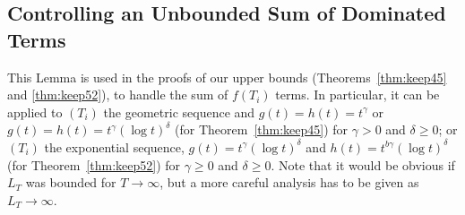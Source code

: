 \documentclass[12pt]{colt2018} %
\begin{document}
\subsection{Controlling an Unbounded Sum of Dominated Terms}

This Lemma is used in the proofs of our upper bounds (Theorems~\ref{thm:keep45} and \ref{thm:keep52}),
to handle the sum of $f(T_i)$ terms.
%
In particular, it can be applied to $(T_i)$ the geometric sequence and $g(t) = h(t) = t^{\gamma}$ or $g(t) = h(t) = t^{\gamma} (\log t)^{\delta}$ (for Theorem~\ref{thm:keep45})
for $\gamma>0$ and $\delta\geq0$;
or $(T_i)$ the exponential sequence, $g(t) = t^{\gamma} (\log t)^{\delta}$ and $h(t) =  t^{b\gamma} (\log t)^{\delta}$ (for Theorem~\ref{thm:keep52})
for $\gamma\geq0$ and $\delta\geq0$.
%
Note that it would be obvious if $L_T$ was bounded for $T\to\infty$, but a more careful analysis has to be given as $L_T \to \infty$.
\end{document}
